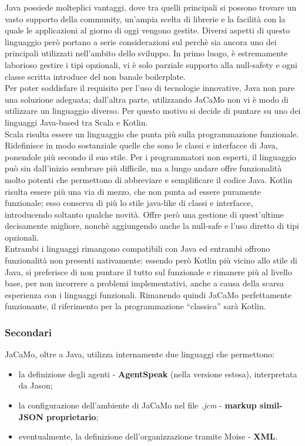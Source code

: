 \documentclass[12pt,a4paper,openright,oneside]{report}
\newcommand{\quotes}[1]{``#1''}
\begin{document}
Java possiede molteplici vantaggi, dove tra quelli principali si possono trovare un vasto supporto della community, un'ampia scelta di librerie e la facilità con la quale le applicazioni al giorno di oggi vengono gestite. Diversi aspetti di questo linguaggio però portano a serie considerazioni sul perchè sia ancora uno dei principali utilizzati nell'ambito dello sviluppo. In primo luogo, è estremamente laborioso gestire i tipi opzionali, vi è solo parziale supporto alla null-safety e ogni classe scritta introduce del non banale boilerplate.\\

Per poter soddisfare il requisito per l'uso di tecnologie innovative, Java non pare una soluzione adeguata; dall'altra parte, utilizzando JaCaMo non vi è modo di utilizzare un linguaggio diverso. Per questo motivo si decide di puntare su uno dei linguaggi Java-based tra Scala e Kotlin.\\

Scala risulta essere un linguaggio che punta più sulla programmazione funzionale. Ridefinisce in modo sostanziale quelle che sono le classi e interfacce di Java, ponendole più secondo il suo stile. Per i programmatori non esperti, il linguaggio può sin dall'inizio sembrare più difficile, ma a lungo andare offre funzionalità molto potenti che permettono di abbreviare e semplificare il codice Java. Kotlin risulta essere più una via di mezzo, che non punta ad essere puramente funzionale; esso conserva di più lo stile java-like di classi e interfacce, introducendo soltanto qualche novità. Offre però una gestione di quest'ultime decisamente migliore, nonchè aggiungendo anche la null-safe e l'uso diretto di tipi opzionali.\\

Entrambi i linguaggi rimangono compatibili con Java ed entrambi offrono funzionalità non presenti nativamente: essendo però Kotlin più vicino allo stile di Java, si preferisce di non puntare il tutto sul funzionale e rimanere più al livello base, per non incorrere a problemi implementativi, anche a causa della scarsa esperienza con i linguaggi funzionali. Rimanendo quindi JaCaMo perfettamente funzionante, il riferimento per la programmazione \quotes{classica} sarà Kotlin.

\subsubsection{Secondari}
JaCaMo, oltre a Java, utilizza internamente due linguaggi che permettono:
\begin{itemize}
	\item la definizione degli agenti - \textbf{AgentSpeak} (nella versione estesa), interpretata da Jason;
	\item la configurazione dell'ambiente di JaCaMo nel file \textit{.jcm} - \textbf{markup simil-JSON proprietario};
	\item eventualmente, la definizione dell'organizzazione tramite Moise - \textbf{XML}.
\end{itemize}
\end{document}
